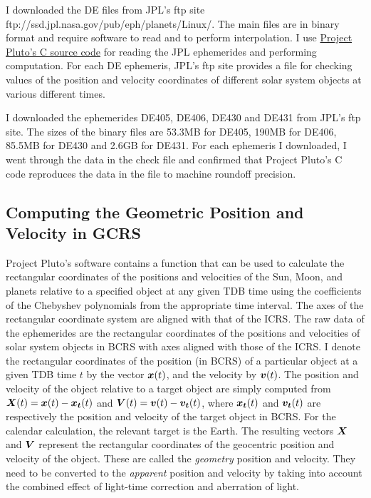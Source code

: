 \documentclass[12pt]{article}
\newcommand{\ve}[1]{\mbox{\boldmath $#1$}}
\begin{document}
\begin{CJK}{UTF8}{bkai}
I downloaded the DE files from JPL's ftp site 
ftp://ssd.jpl.nasa.gov/pub/eph/planets/Linux/. 
The main files are in binary format and require software to read 
and to perform interpolation. I use \href{https://www.projectpluto.com/jpl_eph.htm}
{Project Pluto's C source code} for reading the JPL ephemerides and performing 
computation. For each DE ephemeris, JPL's ftp site provides a file for checking 
values of the position and velocity coordinates of different solar system 
objects at various different times. 

I downloaded the ephemerides DE405, DE406, DE430 and DE431 from 
JPL's ftp site. The sizes of the binary files 
are 53.3MB for DE405, 190MB for DE406, 85.5MB for DE430 and 2.6GB for DE431. 
For each ephemeris I downloaded,
I went through the data in the check file and confirmed that Project Pluto's 
C code reproduces the data in the file to machine roundoff precision.

\subsection{Computing the Geometric Position and Velocity in GCRS}

Project Pluto's software contains a function that can be used to calculate 
the rectangular coordinates of the positions and velocities of the Sun, Moon, 
and planets relative to a specified object at any given TDB time using 
the coefficients of the Chebyshev polynomials from the appropriate time interval. 
The axes of the rectangular coordinate system are aligned with that of the ICRS.  
The raw data of the ephemerides are the rectangular coordinates of the positions 
and velocities of solar system objects in BCRS with axes aligned with those 
of the ICRS. I denote 
the rectangular coordinates of the position (in BCRS) of a particular object 
at a given TDB time $t$ by the vector $\ve{x}(t)$, and the 
velocity by $\ve{v}(t)$. The position and velocity of the object relative to 
a target object are simply computed from 
$\ve{X}(t)=\ve{x}(t)-\ve{x_t}(t)$ and $\ve{V}(t)=\ve{v}(t)-\ve{v_t}(t)$, 
where $\ve{x_t}(t)$ and $\ve{v_t}(t)$ are respectively the position and velocity of 
the target object in BCRS. For the calendar calculation, 
the relevant target is the Earth. The resulting vectors $\ve{X}$ and $\ve{V}$ 
represent the rectangular coordinates of the geocentric position and velocity of the 
object. These are called the {\em geometry} position and velocity. They need to be converted 
to the {\em apparent} position and velocity by taking into account the combined effect 
of light-time correction and aberration of light.


\end{CJK}
\end{document}
